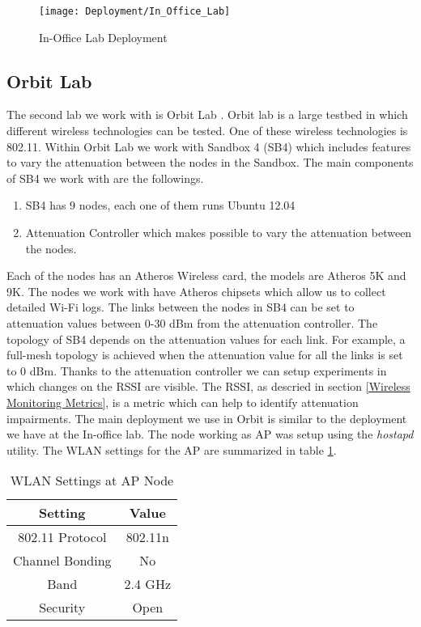 \begin{figure}[h]
	\centering
	\texttt{[image: Deployment/In\_Office\_Lab]}
	\caption{In-Office Lab Deployment}
	\label{image:In_Office_Lab_Deployment}
\end{figure}
		

\subsection*{Orbit Lab}

The second lab we work with is Orbit Lab \cite{orbit2005}. Orbit lab is a large testbed in which different wireless technologies can be tested. One of these wireless technologies is 802.11. Within Orbit Lab we work with Sandbox 4 (SB4) which includes features to vary the attenuation between the nodes in the Sandbox. The main components of SB4 we work with are the followings.

\begin{enumerate}
	\item SB4 has 9 nodes, each one of them runs Ubuntu 12.04
	\item Attenuation Controller which makes possible to vary the attenuation between the nodes.
\end{enumerate}

Each of the nodes has an Atheros Wireless card, the models are Atheros 5K and 9K. The nodes we work with have Atheros chipsets which allow us to collect detailed Wi-Fi logs. The links between the nodes in SB4 can be set to attenuation values between 0-30 dBm from the attenuation controller. The topology of SB4 depends on the attenuation values for each link. For example, a full-mesh topology is achieved when the attenuation value for all the links is set to 0 dBm. Thanks to the attenuation controller we can setup experiments in which changes on the RSSI are visible. The RSSI, as descried in section \ref{Wireless Monitoring Metrics}, is a metric which can help to identify attenuation impairments. The main deployment we use in  Orbit is similar to the deployment we have at the In-office lab. The node working as AP was setup using the \emph{hostapd} utility. The WLAN settings for the AP are summarized in table \ref{table:WLAN_Settings_AP_Node}.

\begin{table}[h]
	\begin{center}
		\begin{tabular}{||c c||}
			\hline
			Setting & Value\\ [0.5ex] 
			\hline\hline
			802.11 Protocol & 802.11n\\ 
			\hline
			Channel Bonding & No\\
			\hline
			Band & 2.4 GHz\\
			\hline
			Security & Open\\ [1ex] 
			\hline
		\end{tabular}
	\end{center}
	\caption{WLAN Settings at AP Node}
	\label{table:WLAN_Settings_AP_Node}
\end{table} 


